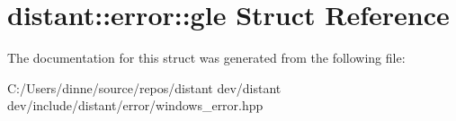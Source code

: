 \hypertarget{structdistant_1_1error_1_1gle}{}\section{distant\+:\+:error\+:\+:gle Struct Reference}
\label{structdistant_1_1error_1_1gle}


The documentation for this struct was generated from the following file\+:\begin{DoxyCompactItemize}
\item 
C\+:/\+Users/dinne/source/repos/distant dev/distant dev/include/distant/error/windows\+\_\+error.\+hpp\end{DoxyCompactItemize}
